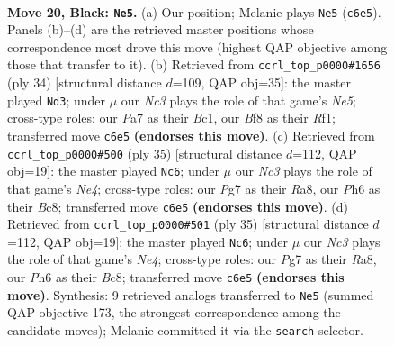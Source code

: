 \documentclass[11pt]{article}
\begin{document}
\clearpage

\begin{figure}[p]\centering
\begin{subfigure}{0.46\textwidth}\centering
\resizebox{\linewidth}{!}{%
\newchessgame
\chessboard[
  setfen={r1q2b1r/p3kpp1/2n2n1p/3P1P1P/B7/6p1/8/R1BQK1NR b KQ - 0 20},
  showmover=false,
  pgfstyle=straightmove, color=movearrow, markmove={c6-e5}
]}
\caption{}
\end{subfigure}\hfill
\begin{subfigure}{0.46\textwidth}\centering
\resizebox{\linewidth}{!}{%
\newchessgame
\chessboard[
  setfen={r1b1r1k1/ppb3p1/2n1q2p/4N3/3P3Q/N1P5/P5PP/R1B2RK1 w - - 2 18},
  showmover=false,
  pgfstyle=straightmove, color=movearrow, markmove={e5-d3}
]}
\caption{}
\end{subfigure}
\\[4pt]
\begin{subfigure}{0.46\textwidth}\centering
\resizebox{\linewidth}{!}{%
\newchessgame
\chessboard[
  setfen={r1bqk2r/5pp1/1p2p3/1Nb1n1Pp/4P3/2Q4P/PP2B3/R1B1K2R b KQkq - 1 18},
  showmover=false,
  pgfstyle=straightmove, color=movearrow, markmove={e5-c6}
]}
\caption{}
\end{subfigure}\hfill
\begin{subfigure}{0.46\textwidth}\centering
\resizebox{\linewidth}{!}{%
\newchessgame
\chessboard[
  setfen={r1bqk2r/5pp1/1p2p3/1Nb1n1Pp/4P3/2Q4P/PP2B3/R1B1K2R b KQkq - 1 18},
  showmover=false,
  pgfstyle=straightmove, color=movearrow, markmove={e5-c6}
]}
\caption{}
\end{subfigure}
\caption{\textbf{Move 20, Black: \texttt{Ne5}.} (a) Our position; Melanie plays \texttt{Ne5} (\texttt{c6e5}). Panels (b)--(d) are the retrieved master positions whose correspondence most drove this move (highest QAP objective among those that transfer to it). (b) Retrieved from \texttt{ccrl\_top\_p0000\#1656} (ply 34) [structural distance $d$=109, QAP obj=35]: the master played \texttt{Nd3}; under $\mu$ our \emph{Nc3} plays the role of that game's \emph{Ne5}; cross-type roles: our \emph{P}a7 as their \emph{B}c1, our \emph{B}f8 as their \emph{R}f1; transferred move \texttt{c6e5} \textbf{(endorses this move)}. (c) Retrieved from \texttt{ccrl\_top\_p0000\#500} (ply 35) [structural distance $d$=112, QAP obj=19]: the master played \texttt{Nc6}; under $\mu$ our \emph{Nc3} plays the role of that game's \emph{Ne4}; cross-type roles: our \emph{P}g7 as their \emph{R}a8, our \emph{P}h6 as their \emph{B}c8; transferred move \texttt{c6e5} \textbf{(endorses this move)}. (d) Retrieved from \texttt{ccrl\_top\_p0000\#501} (ply 35) [structural distance $d$=112, QAP obj=19]: the master played \texttt{Nc6}; under $\mu$ our \emph{Nc3} plays the role of that game's \emph{Ne4}; cross-type roles: our \emph{P}g7 as their \emph{R}a8, our \emph{P}h6 as their \emph{B}c8; transferred move \texttt{c6e5} \textbf{(endorses this move)}. Synthesis: 9 retrieved analogs transferred to \texttt{Ne5} (summed QAP objective 173, the strongest correspondence among the candidate moves); Melanie committed it via the \texttt{search} selector.}
\label{fig:thought-m39}
\end{figure}
\end{document}
